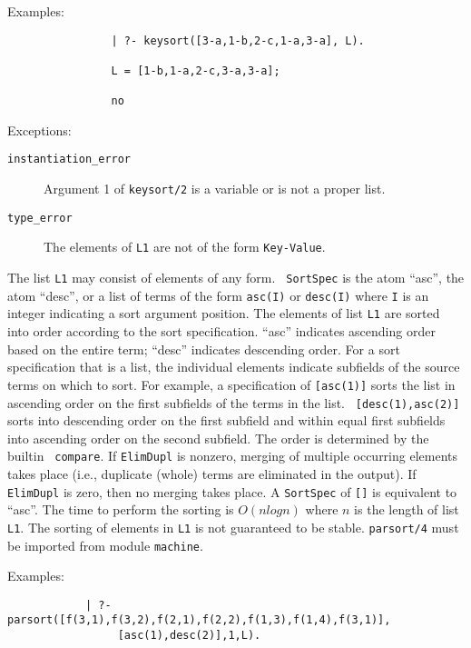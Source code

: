 \begin{description}
    Examples:
    {\footnotesize
     \begin{verbatim}
                | ?- keysort([3-a,1-b,2-c,1-a,3-a], L).

                L = [1-b,1-a,2-c,3-a,3-a];

                no
     \end{verbatim}}
    Exceptions:
    \begin{description}
    \item[{\tt instantiation\_error}]
	Argument 1 of {\tt keysort/2} is a variable or is not a proper list.
    \item[{\tt type\_error}]
	The elements of {\tt L1} are not of the form \verb'Key-Value'.
    \end{description}


    The list {\tt L1} may consist of elements of any form.  {\tt
    SortSpec} is the atom ``asc'', the atom ``desc'', or a list of
    terms of the form {\tt asc(I)} or {\tt desc(I)} where {\tt I} is
    an integer indicating a sort argument position.  The elements of
    list {\tt L1} are sorted into order according to the sort
    specification.  ``asc'' indicates ascending order based on the
    entire term; ``desc'' indicates descending order.  For a sort
    specification that is a list, the individual elements indicate
    subfields of the source terms on which to sort.  For example, a
    specification of {\tt [asc(1)]} sorts the list in ascending order
    on the first subfields of the terms in the list.  {\tt
    [desc(1),asc(2)]} sorts into descending order on the first
    subfield and within equal first subfields into ascending order on
    the second subfield.  The order is determined by the builtin {\tt
    compare}.  If {\tt ElimDupl} is nonzero, merging of multiple
    occurring elements takes place (i.e., duplicate (whole) terms are
    eliminated in the output).  If {\tt ElimDupl} is zero, then no
    merging takes place.  A {\tt SortSpec} of {\tt []} is equivalent
    to ``asc''.  The time to perform the sorting is $O(n log n)$ where
    $n$ is the length of list {\tt L1}.  The sorting of elements in
    {\tt L1} is not guaranteed to be stable. {\tt parsort/4} must be
    imported from module {\tt machine}.

    Examples:
    {\footnotesize
     \begin{verbatim}
            | ?- parsort([f(3,1),f(3,2),f(2,1),f(2,2),f(1,3),f(1,4),f(3,1)],
                 [asc(1),desc(2)],1,L). 


\end{verbatim}}
\end{description}
